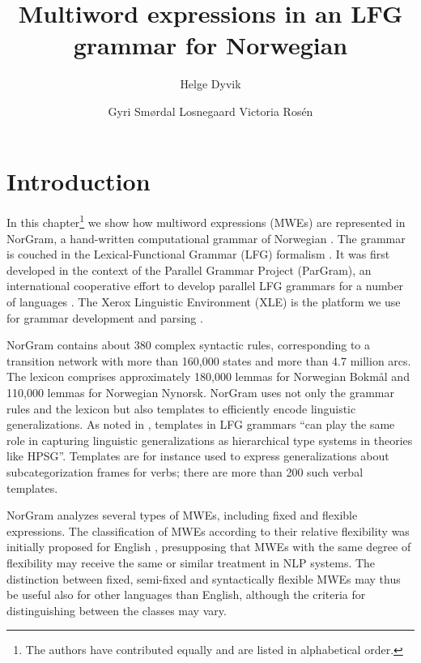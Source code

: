 \documentclass[output=paper]{langsci/langscibook}
\title{Multiword expressions in an {LFG} grammar for {N}orwegian}
\author{Helge Dyvik\affiliation{University of Bergen}
\and
Gyri Smørdal Losnegaard\affiliation{University of Bergen}
\lastand
Victoria Rosén\affiliation{University of Bergen}
}
\begin{document}
\section{Introduction}\label{sec:intro}

%
%

In this chapter\footnote{The authors have contributed equally and are listed in alphabetical order.} we show how multiword expressions (MWEs) are represented in NorGram, a hand-written computational grammar of Norwegian \citep{dyvik00en}. 
The grammar is couched in the Lexical-Functional Grammar (LFG) formalism \citep{bresnanlfs,dalrymplelfg}.
It was first developed in the context of the Parallel Grammar Project (ParGram), an international cooperative effort to develop parallel LFG grammars for a number of languages \citep{pargram02}.
The Xerox Linguistic Environment (XLE) is the platform we use for grammar development and parsing \citep{maxwell93}.

NorGram contains about 380 complex syntactic rules, corresponding to a transition network with more than 160,000 states and more than 4.7 million arcs.
The lexicon comprises approximately 180,000 lemmas for Norwegian Bokmål and 110,000 lemmas for Norwegian Nynorsk.
NorGram uses not only the grammar rules and the lexicon but also templates to efficiently encode linguistic generalizations.
As noted in \citet[207]{dalrymple04}, templates in LFG grammars “can play the same role in capturing linguistic generalizations as hierarchical type systems in theories like HPSG”.
Templates are for instance used to express generalizations about subcategorization frames for verbs; there are more than 200 such verbal templates.  

NorGram analyzes several types of MWEs, including fixed and flexible expressions.
The classification of MWEs according to their relative flexibility was initially proposed for English \citep{sag02, baldwin10}, presupposing that MWEs with the same degree of flexibility may receive the same or similar treatment in NLP systems.
The distinction between fixed, semi-fixed and syntactically flexible MWEs may thus be useful also for other languages than English, although the criteria for distinguishing between the classes may vary.
\end{document}
